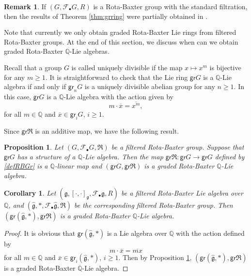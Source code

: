 \documentclass[12pt]{amsart}
\newtheorem{cor}[thm]{Corollary}
\newtheorem{pro}[thm]{Proposition}
\theoremstyle{definition}   %
\newtheorem{rmk}[thm]{Remark}
\newcommand{\gr}{\mathsf{gr}}
\newcommand{\g}{\mathfrak g}
\newcommand{\huaF}{\mathcal{F}}
\newcommand{\frkR}{\mathfrak R}
\begin{document}
\begin{rmk}
    If $(G,\huaF_{\bullet}G,R)$ is a Rota-Baxter group with the standard filtration, then the results of Theorem  \ref{thm:grring} were partially obtained in \cite{BarGub}.
\end{rmk}


Note that currently we only obtain graded Rota-Baxter Lie rings from filtered Rota-Baxter groups. At the end of this section, we discuss when can we obtain graded Rota-Baxter $\mathbb Q$-Lie algebras.

Recall that
    a group $G$ is called uniquely divisible if the map $x\mapsto x^m$ is bijective for any $m\geq 1$.
It is straightforward to check that the Lie ring $\gr G$ is a $\mathbb Q$-Lie algebra if and only if $\gr_nG$ is a uniquely divisible abelian group for any $n\geq 1$. In this case, $\gr G$ is a $\mathbb Q$-Lie algebra  with the action given by
\begin{equation}\label{act}
m\cdot\overline{x}=\overline{x^m},
\end{equation}
for all $m\in \mathbb Q$ and $\overline{x}\in \gr_iG$, $i\geq 1$.

Since $\gr\frkR$ is an additive map, we have the following result.
\begin{pro}\label{pro:qcondition}
Let $(G,\huaF_{\bullet}G,\frkR)$ be a filtered Rota-Baxter group. Suppose that $\gr G$ has a structure of a $\mathbb Q$-Lie algebra. Then  the  map $\gr\frkR:\gr G\rightarrow \gr G$ defined by \eqref{defRBGr} is a $\mathbb Q$-linear map and $(\gr G,\gr\frkR)$ is a graded Rota-Baxter $\mathbb Q$-Lie algebra.
\end{pro}


\begin{cor}
 Let $(\g,[\cdot,\cdot]_\g,\huaF_{\bullet}\g,R)$ be a filtered Rota-Baxter Lie algebra over $\mathbb Q$, and $(\widehat{\g},*, \huaF_{\bullet}\widehat{\g},\frkR)$ be the corresponding filtered Rota-Baxter group. Then $(\gr(\widehat{\g},*),\gr\frkR)$ is a graded Rota-Baxter $\mathbb Q$-Lie algebra.
\end{cor}
\begin{proof}
 It is obvious that  $\gr(\widehat{\g},*)$ is a Lie algebra over $\mathbb Q$ with the action defined by
$$
m\cdot \overline{x}=\overline{mx}
$$
for all $m\in\mathbb Q$ and $\overline{x}\in \gr_i(\widehat{\g},*)$, $i\geq 1$. Then by Proposition \ref{pro:qcondition}, $(\gr(\widehat{\g},*),\gr\frkR)$ is a graded Rota-Baxter $\mathbb Q$-Lie algebra.
\end{proof}
\end{document}
